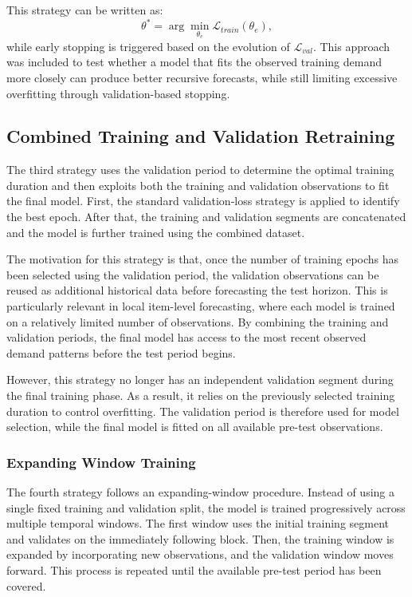 This strategy can be written as:
\[
    \theta^{*} = \arg\min_{\theta_e} \mathcal{L}_{train}(\theta_e),
\]
while early stopping is triggered based on the evolution of \(\mathcal{L}_{val}\). This approach was included to test whether a model that fits the observed training demand more closely can produce better recursive forecasts, while still limiting excessive overfitting through validation-based stopping.

\subsection{Combined Training and Validation Retraining}

The third strategy uses the validation period to determine the optimal training duration and then exploits both the training and validation observations to fit the final model. First, the standard validation-loss strategy is applied to identify the best epoch. After that, the training and validation segments are concatenated and the model is further trained using the combined dataset.

The motivation for this strategy is that, once the number of training epochs has been selected using the validation period, the validation observations can be reused as additional historical data before forecasting the test horizon. This is particularly relevant in local item-level forecasting, where each model is trained on a relatively limited number of observations. By combining the training and validation periods, the final model has access to the most recent observed demand patterns before the test period begins.

However, this strategy no longer has an independent validation segment during the final training phase. As a result, it relies on the previously selected training duration to control overfitting. The validation period is therefore used for model selection, while the final model is fitted on all available pre-test observations.

\subsubsection{Expanding Window Training}

The fourth strategy follows an expanding-window procedure. Instead of using a single fixed training and validation split, the model is trained progressively across multiple temporal windows. The first window uses the initial training segment and validates on the immediately following block. Then, the training window is expanded by incorporating new observations, and the validation window moves forward. This process is repeated until the available pre-test period has been covered.

